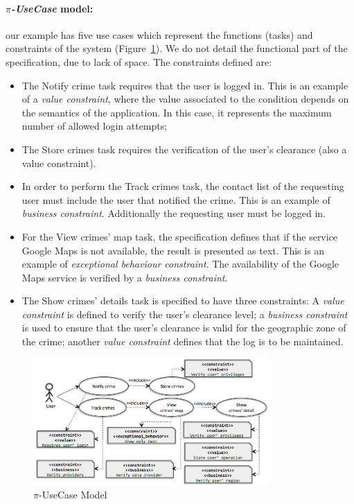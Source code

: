 \paragraph*{\textit{$\pi$-UseCase} model:} 
our example has five use cases which represent the
 functions (tasks) and constraints of the system (Figure~\ref{fig:piUC}). 
We do not detail the functional part of the specification, due to lack of space.
The constraints defined are: 
\begin{itemize}
  \item The \textsf{Notify crime} task requires that the user is logged in. 
  This is an example of a \textit{value constraint}, where the value associated to the condition depends on the semantics of the application.
  In this case, it represents the maximum number of allowed login attempts;
\item The \textsf{Store crimes} task requires the verification of the user's clearance (also a value constraint). 
\item In order to perform the \textsf{Track crimes} task,
the contact list of the requesting user must include the user that notified the crime.
This is an example of \textit{business constraint}.
Additionally the requesting user must be logged in.
\item  For the \textsf{View crimes' map} task, the specification defines that if the service \textsf{Google Maps}  is not available, the result is presented as text. This is an example of \textit{exceptional behaviour constraint}. 
The availability of the \textsf{Google Maps} service is verified by a \textit{business constraint}.
 \item The \textsf{Show crimes' details} task is specified to have three constraints: A \textit{value constraint} is defined to verify the user's clearance level; a \textit{business constraint} is used to ensure that the user's clearance is valid for the geographic zone of the crime; another \textit{value constraint} defines that the log is to be maintained.
\end{itemize}
\begin{figure}[t]
\centering
\includegraphics[width=0.8\textwidth]{figs/piUseCase}
\caption{$\pi$-UseCase Model}
\label{fig:piUC}
\end{figure}


